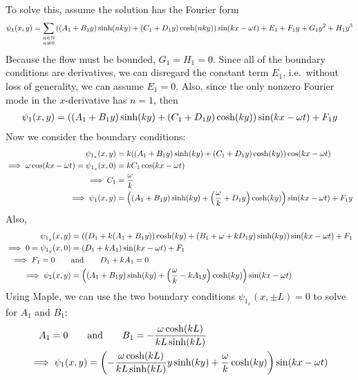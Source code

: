 \documentclass{article} %
\theoremstyle{plain}
\numberwithin{equation}{section} %
\numberwithin{figure}{section} %
\numberwithin{table}{section} %
\begin{document}
To solve this, assume the solution has the Fourier form
\begin{align*}
    \psi_1(x,y) = \sum_{\substack{n \in \mathbb{N} \\ n \neq 0}} \qty(\qty(A_1 + B_1 y)\sinh(nky) + \qty(C_1 + D_1 y)\cosh(nky))\sin(kx - \omega t) + E_1 + F_1 y + G_1 y^2 + H_1 y^3
\end{align*}
Because the flow must be bounded, $G_1 = H_1 = 0$.  Since all of the boundary conditions are derivatives, we can disregard the constant term $E_1$, i.e.~without loss of generality, we can assume $E_1 = 0$.  Also, since the only nonzero Fourier mode in the $x$-derivative has $n = 1$, then
\begin{align*}
    \psi_1(x,y) = \qty(\qty(A_1 + B_1 y)\sinh(ky) + \qty(C_1 + D_1 y)\cosh(ky))\sin(kx - \omega t) + F_1 y
\end{align*}
Now we consider the boundary conditions:
\begin{align*}
    \psi_{1_x}(x,y) &= k\qty(\qty(A_1 + B_1 y)\sinh(ky) + \qty(C_1 + D_1 y)\cosh(ky))\cos(kx - \omega t) \\
    \implies \omega\cos(kx - \omega t) = \psi_{1_x}(x,0) &= kC_1\cos(kx - \omega t) \\
    \implies C_1 &= \frac{\omega}{k} \\
    \implies \psi_1(x,y) &= \qty(\qty(A_1 + B_1 y)\sinh(ky) + \qty(\frac{\omega}{k} + D_1 y)\cosh(ky))\sin(kx - \omega t) + F_1 y
\end{align*}
Also,
\begin{align*}
    \psi_{1_y}(x,y) &= \qty(\qty(D_1 + k(A_1 + B_1y))\cosh(ky) + \qty(B_1 + \omega + kD_1y)\sinh(ky))\sin(kx - \omega t)+ F_1 \\
    \implies 0 = \psi_{1_y}(x,0) &= (D_1 + k A_1)\sin(kx - \omega t) + F_1 \\
    \implies F_1 = 0 \qquad &\text{and} \qquad D_1 + kA_1 = 0 \\
    \implies \psi_1(x,y) &= \qty(\qty(A_1 + B_1 y)\sinh(ky) + \qty(\frac{\omega}{k} - k A_1 y)\cosh(ky))\sin(kx - \omega t)
\end{align*}
Using Maple, we can use the two boundary conditions $\psi_{1_x}(x, \pm L) = 0$ to solve for $A_1$ and $B_1$:
\begin{align*}
    A_1 = 0 \qquad &\text{and} \qquad B_1 = -\frac{\omega\cosh(kL)}{kL\sinh(kL)} \\
    \implies \psi_1(x,y) &= \qty(-\frac{\omega\cosh(kL)}{kL\sinh(kL)}y\sinh(ky) + \frac{\omega}{k}\cosh(ky))\sin(kx - \omega t)
\end{align*}
\end{document}
